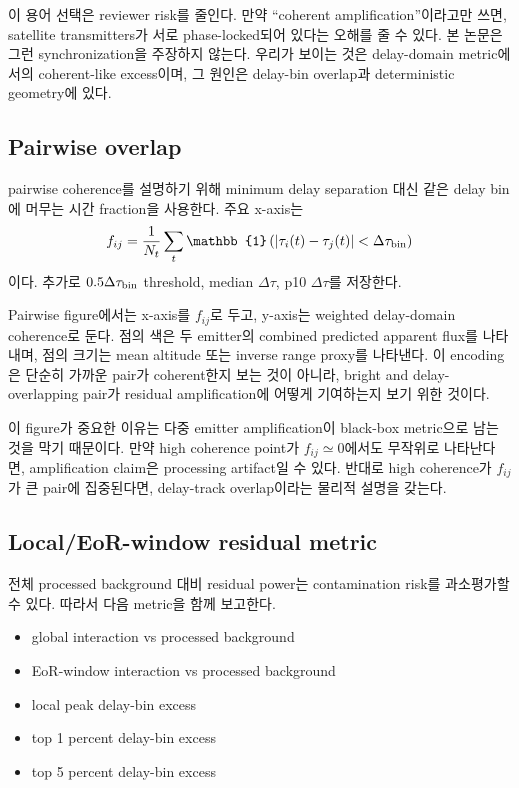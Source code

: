 \documentclass[11pt,a4paper]{article}
\begin{document}
이 용어 선택은 reviewer risk를 줄인다.
만약 ``coherent amplification''이라고만 쓰면, satellite transmitters가 서로 phase-locked되어 있다는 오해를 줄 수 있다.
본 논문은 그런 synchronization을 주장하지 않는다.
우리가 보이는 것은 delay-domain metric에서의 coherent-like excess이며, 그 원인은 delay-bin overlap과 deterministic geometry에 있다.

\subsection{Pairwise overlap}

pairwise coherence를 설명하기 위해 minimum delay separation 대신 같은 delay bin에 머무는 시간 fraction을 사용한다.
주요 x-axis는
\begin{equation}
  f_{ij}
  =
  \frac{1}{N_t}
  \sum_t
  \mathbb{1}
  \left(
  |\tau_i(t)-\tau_j(t)| < \Delta\tau_{\rm bin}
  \right)
\end{equation}
이다.
추가로 $0.5\Delta\tau_{\rm bin}$ threshold, median $\Delta\tau$, p10 $\Delta\tau$를 저장한다.

Pairwise figure에서는 x-axis를 $f_{ij}$로 두고, y-axis는 weighted delay-domain coherence로 둔다.
점의 색은 두 emitter의 combined predicted apparent flux를 나타내며, 점의 크기는 mean altitude 또는 inverse range proxy를 나타낸다.
이 encoding은 단순히 가까운 pair가 coherent한지 보는 것이 아니라, bright and delay-overlapping pair가 residual amplification에 어떻게 기여하는지 보기 위한 것이다.

이 figure가 중요한 이유는 다중 emitter amplification이 black-box metric으로 남는 것을 막기 때문이다.
만약 high coherence point가 $f_{ij}\simeq 0$에서도 무작위로 나타난다면, amplification claim은 processing artifact일 수 있다.
반대로 high coherence가 $f_{ij}$가 큰 pair에 집중된다면, delay-track overlap이라는 물리적 설명을 갖는다.

\subsection{Local/EoR-window residual metric}

전체 processed background 대비 residual power는 contamination risk를 과소평가할 수 있다.
따라서 다음 metric을 함께 보고한다.
\begin{itemize}
  \item global interaction vs processed background
  \item EoR-window interaction vs processed background
  \item local peak delay-bin excess
  \item top 1 percent delay-bin excess
  \item top 5 percent delay-bin excess
\end{itemize}
\end{document}
